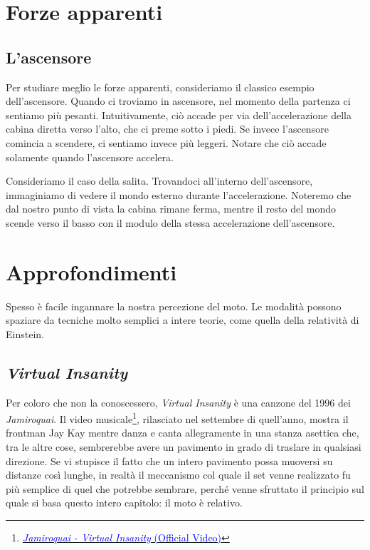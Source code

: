 \section{Forze apparenti}


\subsection{L'ascensore}
Per studiare meglio le forze apparenti, consideriamo il classico
esempio dell'ascensore. Quando ci troviamo in ascensore, nel
momento della partenza ci sentiamo più pesanti. Intuitivamente,
ciò accade per via dell'accelerazione della cabina diretta verso
l'alto, che ci preme sotto i piedi. Se invece l'ascensore comincia
a scendere, ci sentiamo invece più leggeri. Notare che ciò accade
solamente quando l'ascensore accelera.

Consideriamo il caso della salita. Trovandoci all'interno dell'ascensore,
immaginiamo di vedere il mondo esterno durante l'accelerazione. Noteremo
che dal nostro punto di vista la cabina rimane ferma, mentre il resto del
mondo scende verso il basso con il modulo della stessa accelerazione
dell'ascensore.


\section{Approfondimenti}
Spesso è facile ingannare la nostra percezione del moto. Le modalità
possono spaziare da tecniche molto semplici a intere teorie, come
quella della relatività di Einstein.

\subsection{\textit{Virtual Insanity}}
Per coloro che non la conoscessero, \textit{Virtual Insanity} è
una canzone del 1996 dei \textit{Jamiroquai}. Il video
musicale\footnote{\href{https://www.youtube.com/watch?v=4JkIs37a2JE}{\textcolor{blue}{\textit{Jamiroquai - Virtual Insanity} (Official Video)}}},
rilasciato nel settembre di quell'anno, mostra il frontman Jay Kay
mentre danza e canta allegramente in una stanza asettica che, tra
le altre cose, sembrerebbe avere un pavimento in grado di traslare
in qualsiasi direzione. Se vi stupisce il fatto che un intero
pavimento possa muoversi su distanze così lunghe, in realtà il
meccanismo col quale il set venne realizzato fu più semplice di
quel che potrebbe sembrare, perché venne sfruttato il principio
sul quale si basa questo intero capitolo: il moto è relativo.


